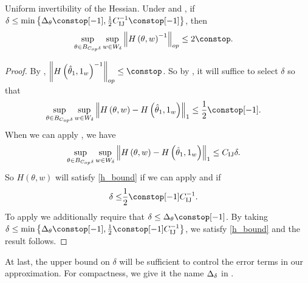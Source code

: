 \begin{lem}
\label{lem:continuous_invertibility}Uniform invertibility of the
Hessian. Under \paperallcoreassum and , if $\delta\le\min\left\{ \thetasize\constop[-1],\frac{1}{2}\constij^{-1}\constop[-1]\right\} $,
then
\begin{align*}
\sup_{\theta\in\thetadeltaball}\sup_{w\in W_{\delta}}\norm{H\left(\theta,w\right)^{-1}}_{op} & \le2\constop.
\end{align*}
\end{lem}
\begin{proof}
By , $\norm{H\left(\thetaone,\onevec\right)^{-1}}_{op}\le\constop$.
So by , it will suffice to select
$\delta$ so that
\begin{align}
\sup_{\theta\in\thetadeltaball}\sup_{w\in W_{\delta}}\norm{H\left(\theta,w\right)-H\left(\thetaone,\onevec\right)}_{1} & \le\frac{1}{2}\constop[-1].\label{eq:h_bound}
\end{align}
When we can apply , we have
\begin{align*}
\sup_{\theta\in B_{C_{op}\delta}}\sup_{w\in W_{\delta}}\left\Vert H\left(\theta,w\right)-H\left(\hat{\theta}_{1},1_{w}\right)\right\Vert_{1} & \le C_{\textrm{IJ}}\delta.
\end{align*}
So $H\left(\theta,w\right)$ will satisfy \eqref{h_bound} if we can
apply  and if
\begin{align*}
\delta\le & \frac{1}{2}\constop[-1]\constij^{-1}.
\end{align*}
To apply  we additionally require
that $\delta\le\thetasize\constop[-1]$. By taking $\delta\le\min\left\{ \thetasize\constop[-1],\frac{1}{2}\constop[-1]\constij^{-1}\right\} $,
we satisfy \eqref{h_bound} and the result follows.
\end{proof}
%
At last, the upper bound on $\delta$ will be sufficient to control
the error terms in our approximation. For compactness, we give it
the name $\Delta_{\delta}$ in .
%

